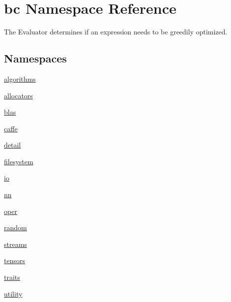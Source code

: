 \hypertarget{namespacebc}{}\section{bc Namespace Reference}
\label{namespacebc}


The Evaluator determines if an expression needs to be greedily optimized.  


\subsection*{Namespaces}
\begin{DoxyCompactItemize}
\item 
 \hyperlink{namespacebc_1_1algorithms}{algorithms}
\item 
 \hyperlink{namespacebc_1_1allocators}{allocators}
\item 
 \hyperlink{namespacebc_1_1blas}{blas}
\item 
 \hyperlink{namespacebc_1_1caffe}{caffe}
\item 
 \hyperlink{namespacebc_1_1detail}{detail}
\item 
 \hyperlink{namespacebc_1_1filesystem}{filesystem}
\item 
 \hyperlink{namespacebc_1_1io}{io}
\item 
 \hyperlink{namespacebc_1_1nn}{nn}
\item 
 \hyperlink{namespacebc_1_1oper}{oper}
\item 
 \hyperlink{namespacebc_1_1random}{random}
\item 
 \hyperlink{namespacebc_1_1streams}{streams}
\item 
 \hyperlink{namespacebc_1_1tensors}{tensors}
\item 
 \hyperlink{namespacebc_1_1traits}{traits}
\item 
 \hyperlink{namespacebc_1_1utility}{utility}
\end{DoxyCompactItemize}
